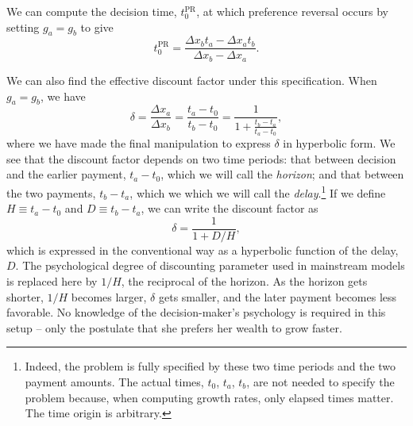 \documentclass[11pt]{article}
\newcommand{\elabel}[1]{\label{eq:#1}}
\newcommand{\be}{\begin{equation}}
\newcommand{\ee}{\end{equation}}
\newcommand{\Dx}{\Delta x}
\newcommand{\del}{D}
\newcommand{\hor}{H}
\numberwithin{equation}{section}
\begin{document}
We can compute the decision time, $t_0^\text{PR}$, at which preference reversal occurs by setting $g_a=g_b$ to give
\be
t_0^\text{PR} = \frac{\Dx_b t_a - \Dx_a t_b}{\Dx_b - \Dx_a}.
\elabel{t0PR}
\ee

We can also find the effective discount factor under this specification. When $g_a=g_b$, we have
\be
\delta = \frac{\Dx_a}{\Dx_b} = \frac{t_a-t_0}{t_b-t_0} = \frac{1}{1+\frac{t_b-t_a}{t_a-t_0}},
\ee
where we have made the final manipulation to express $\delta$ in hyperbolic form. We see that the discount factor depends on two time periods: that between decision and the earlier payment, $t_a-t_0$, which we will call the \textit{horizon}; and that between the two payments, $t_b-t_a$, which we which we will call the \textit{delay}.\footnote{Indeed, the problem is fully specified by these two time periods and the two payment amounts. The actual times, $t_0$, $t_a$, $t_b$, are not needed to specify the problem because, when computing growth rates, only elapsed times matter. The time origin is arbitrary.} If we define $\hor\equiv t_a-t_0$ and $\del\equiv t_b-t_a$, we can write the discount factor as
\be
\delta = \frac{1}{1+\del/\hor},
\ee
which is expressed in the conventional way as a hyperbolic function of the delay, $\del$. The psychological degree of discounting parameter used in mainstream models is replaced here by $1/\hor$, the reciprocal of the horizon. As the horizon gets shorter, $1/\hor$ becomes larger, $\delta$ gets smaller, and the later payment becomes less favorable. No knowledge of the decision-maker's psychology is required in this setup -- only the postulate that she prefers her wealth to grow faster.
\end{document}
